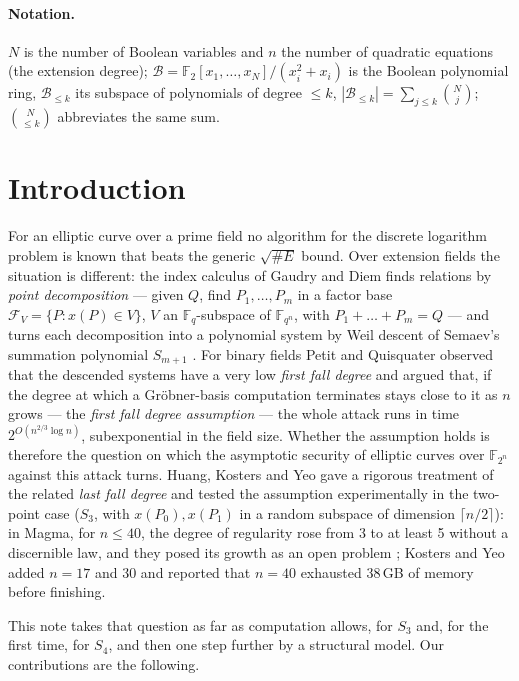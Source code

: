 \documentclass[11pt,a4paper]{article}
\theoremstyle{remark}\newtheorem{remark}{Remark}
\newcommand{\F}{\mathbb{F}}
\newcommand{\B}{\mathcal{B}}
\begin{document}
\paragraph{Notation.} $N$ is the number of Boolean variables and $n$ the number of quadratic equations (the extension degree); $\B=\F_2[x_1,\dots,x_N]/(x_i^2+x_i)$ is the Boolean polynomial ring, $\B_{\le k}$ its subspace of polynomials of degree $\le k$, $|\B_{\le k}|=\sum_{j\le k}\binom Nj$; $\binom{N}{\le k}$ abbreviates the same sum.

\section{Introduction}

For an elliptic curve over a prime field no algorithm for the discrete logarithm problem is known that beats the generic $\sqrt{\#E}$ bound. Over extension fields the situation is different: the index calculus of Gaudry \cite{Gaudry09} and Diem \cite{Diem11,Diem13} finds relations by \emph{point decomposition} --- given $Q$, find $P_1,\dots,P_m$ in a factor base $\mathcal F_V=\{P: x(P)\in V\}$, $V$ an $\F_q$-subspace of $\F_{q^n}$, with $P_1+\dots+P_m=Q$ --- and turns each decomposition into a polynomial system by Weil descent of Semaev's summation polynomial $S_{m+1}$ \cite{Semaev04}. For binary fields Petit and Quisquater \cite{PQ12} observed that the descended systems have a very low \emph{first fall degree} and argued that, if the degree at which a Gröbner-basis computation terminates stays close to it as $n$ grows --- the \emph{first fall degree assumption} --- the whole attack runs in time $2^{O(n^{2/3}\log n)}$, subexponential in the field size. Whether the assumption holds is therefore the question on which the asymptotic security of elliptic curves over $\F_{2^n}$ against this attack turns. Huang, Kosters and Yeo \cite{HKY15} gave a rigorous treatment of the related \emph{last fall degree} and tested the assumption experimentally in the two-point case ($S_3$, with $x(P_0),x(P_1)$ in a random subspace of dimension $\lceil n/2\rceil$): in Magma, for $n\le40$, the degree of regularity rose from 3 to at least 5 without a discernible law, and they posed its growth as an open problem \cite[Sec.~5.2]{HKY15}; Kosters and Yeo \cite{KY15} added $n=17$ and $30$ and reported that $n=40$ exhausted 38\,GB of memory before finishing.

This note takes that question as far as computation allows, for $S_3$ and, for the first time, for $S_4$, and then one step further by a structural model. Our contributions are the following.
\end{document}
